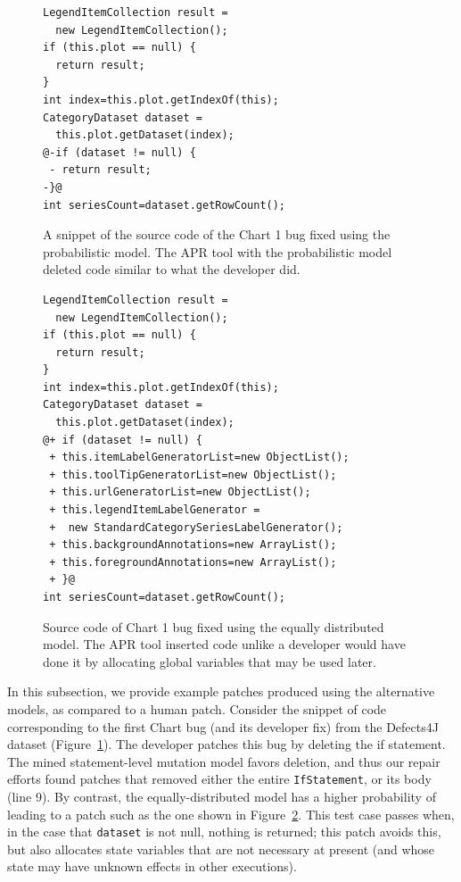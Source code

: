 \documentclass[conference]{IEEEtran}
\begin{document}
\begin{figure}[t]
\begin{lstlisting}[frame=single,style=base]
LegendItemCollection result = 
  new LegendItemCollection();
if (this.plot == null) {
  return result;
}
int index=this.plot.getIndexOf(this);
CategoryDataset dataset = 
  this.plot.getDataset(index);
@-if (dataset != null) {
 - return result;
-}@
int seriesCount=dataset.getRowCount();
	\end{lstlisting}
	\caption{A snippet of the source code of the Chart 1 bug fixed using the
      probabilistic model. The APR tool with the probabilistic model deleted code similar to what the
      developer did.\label{fig:chart1.1}}
\end{figure}

\begin{figure}[t]
\begin{lstlisting}[frame=single,style=base]
LegendItemCollection result = 
  new LegendItemCollection();
if (this.plot == null) {
  return result;
}
int index=this.plot.getIndexOf(this);
CategoryDataset dataset = 
  this.plot.getDataset(index);
@+ if (dataset != null) { 
 + this.itemLabelGeneratorList=new ObjectList();
 + this.toolTipGeneratorList=new ObjectList();
 + this.urlGeneratorList=new ObjectList();
 + this.legendItemLabelGenerator = 
 +  new StandardCategorySeriesLabelGenerator();
 + this.backgroundAnnotations=new ArrayList();
 + this.foregroundAnnotations=new ArrayList();
 + }@
int seriesCount=dataset.getRowCount();
	\end{lstlisting}
	\caption{Source code of Chart 1 bug fixed using the equally distributed
      model. The APR tool inserted code unlike a developer would have done it by
      allocating global variables that may be used later.\label{fig:chart1.3}}

\end{figure}


In this subsection, we provide example patches produced using the alternative
models, as compared to a human patch.  Consider the snippet of code corresponding
to the first Chart bug (and its developer fix) from the Defects4J dataset
(Figure~\ref{fig:chart1.1}).  The developer patches this bug by deleting the if
statement.  The mined statement-level mutation model favors deletion, and thus
our repair efforts found patches that removed either the entire \texttt{IfStatement}, or its body (line 9).
By contrast, the equally-distributed model has a higher probability of leading
to a patch such as the one shown in Figure~\ref{fig:chart1.3}.  This test case
passes when, in the case that \texttt{dataset} is not null, nothing is returned;
this patch avoids this, but also allocates state variables that are not
necessary at present (and whose state may have unknown effects in other
executions). 
\end{document}
